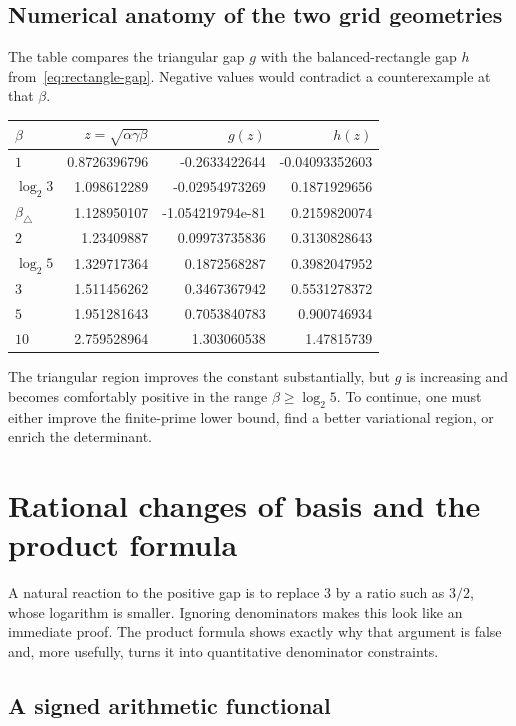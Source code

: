 \documentclass[11pt,oneside]{article}
\theoremstyle{definition}
\theoremstyle{remark}
\begin{document}
\subsection{Numerical anatomy of the two grid geometries}

The table compares the triangular gap $g$ with the balanced-rectangle gap $h$
from~\eqref{eq:rectangle-gap}.  Negative values would contradict a
counterexample at that $\beta$.

\begin{center}
\begin{tabular}{lrrr}
\toprule
$\beta$ & $z=\sqrt{\alpha\gamma\beta}$ & $g(z)$ & $h(z)$ \\
\midrule
$1$ & 0.8726396796 & -0.2633422644 & -0.04093352603 \\
$\log_2 3$ & 1.098612289 & -0.02954973269 & 0.1871929656 \\
$\beta_{\triangle}$ & 1.128950107 & -1.054219794e-81 & 0.2159820074 \\
$2$ & 1.23409887 & 0.09973735836 & 0.3130828643 \\
$\log_2 5$ & 1.329717364 & 0.1872568287 & 0.3982047952 \\
$3$ & 1.511456262 & 0.3467367942 & 0.5531278372 \\
$5$ & 1.951281643 & 0.7053840783 & 0.900746934 \\
$10$ & 2.759528964 & 1.303060538 & 1.47815739 \\
\bottomrule
\end{tabular}
\end{center}

The triangular region improves the constant substantially, but $g$ is
increasing and becomes comfortably positive in the range $\beta\ge\log_2 5$.
To continue, one must either improve the finite-prime lower bound, find a
better variational region, or enrich the determinant.

\section{Rational changes of basis and the product formula}

A natural reaction to the positive gap is to replace $3$ by a ratio such as
$3/2$, whose logarithm is smaller.  Ignoring denominators makes this look like
an immediate proof.  The product formula shows exactly why that argument is
false and, more usefully, turns it into quantitative denominator constraints.

\subsection{A signed arithmetic functional}
\end{document}
